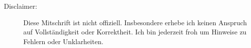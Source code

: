 \documentclass[a4paper,12pt,headings=small,ngerman,bibliography=totoc]{scrartcl}
\begin{document}
\vspace{\fill}
\begin{description}
  \item[Disclaimer:] Diese Mitschrift ist nicht offiziell. Insbesondere erhebe ich keinen Anspruch auf Vollständigkeit oder Korrektheit. Ich bin jederzeit froh um Hinweise zu Fehlern oder Unklarheiten.
\end{description}

\newpage
\tableofcontents
\cleardoublepage

\newpage
\pagestyle{scrheadings}
\ihead{\rightmark}
\end{document}
